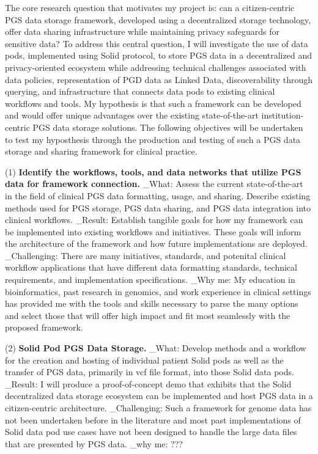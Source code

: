 \documentclass[a4paper,11pt]{article}
\begin{document}
The core research question that motivates my project is: can a citizen-centric PGS data storage framework, developed using a decentralized storage technology, offer data sharing infrastructure while maintaining privacy safeguards for sensitive data? 
To address this central question, I will investigate the use of data pods, implemented using Solid protocol, to store PGS data in a decentralized and privacy-oriented ecosystem while addressing technical challenges associated with data policies, representation of PGD data as Linked Data, discoverability through querying, and infrastructure that connects data pods to existing clinical workflows and tools. 
My hypothesis is that such a framework can be developed and would offer unique advantages over the existing state-of-the-art institution-centric PGS data storage solutions. 
The following objectives will be undertaken to test my hyposthesis through the production and testing of such a PGS data storage and sharing framework for clinical practice.

(1) \textbf{Identify the workflows, tools, and data networks that utilize PGS data for framework connection.}
_What: Assess the current state-of-the-art in the field of clinical PGS data formatting, usage, and sharing. 
Describe existing methods used for PGS storage, PGS data sharing, and PGS data integration into clinical workflows.
_Result: Establish tangible goals for how my framework can be implemented into existing workflows and initiatives. These goals will inform the architecture of the framework and how future implementations are deployed. 
_Challenging: There are many initiatives, standards, and potenital clinical workflow applications that have different data formatting standards, technical requirements, and implementation specifications. 
_Why me: My education in bioinformatics, past research in genomics, and work experience in clinical settings has provided me with the tools and skills necessary to parse the many options and select those that will offer high impact and fit most seamlessly with the proposed framework.


(2) \textbf{Solid Pod PGS Data Storage.}
_What: Develop methods and a workflow for the creation and hosting of individual patient Solid pods as well as the transfer of PGS data, primarily in vcf file format, into those Solid data pods. 
_Result: I will produce a proof-of-concept demo that exhibits that the Solid decentralized data storage ecosystem can be implemented and host PGS data in a citizen-centric architecture.
_Challenging: Such a framework for genome data has not been undertaken before in the literature and most past implementations of Solid data pod use cases have not been designed to handle the large data files that are presented by PGS data. 
_why me: ???
\end{document}
